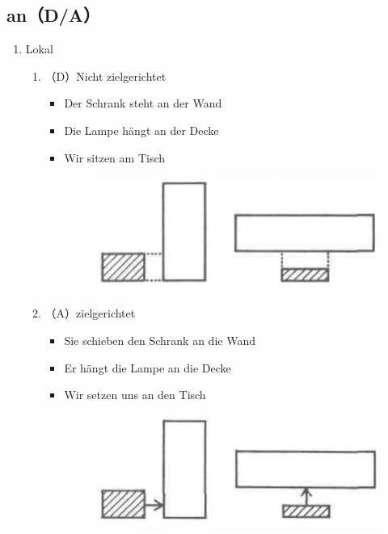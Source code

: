 \documentclass[UTF8]{report}
\begin{document}
\subsection{an（D/A）}
\begin{enumerate}
    \item Lokal
    \begin{enumerate}
        \item （D）Nicht zielgerichtet
        \begin{itemize}
            \item Der Schrank steht an der Wand
            \item Die Lampe hängt an der Decke
            \item Wir sitzen am Tisch
            \begin{figure}[H]
                \centering
                \includegraphics[scale=0.3]{an1.png}
            \end{figure}
        \end{itemize}
        \item （A）zielgerichtet
        \begin{itemize}
            \item Sie schieben den Schrank an die Wand
            \item Er hängt die Lampe an die Decke
            \item Wir setzen uns an den Tisch
            \begin{figure}[H]
                \centering
                \includegraphics[scale=0.3]{an2.png}

\end{figure}
\end{itemize}
\end{enumerate}
\end{enumerate}
\end{document}
